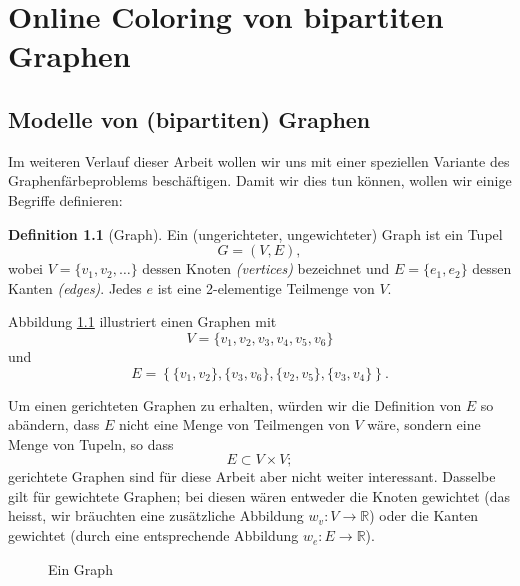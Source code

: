 \documentclass[11pt,abstracton]{scrreprt} %
\theoremstyle{definition}
\newtheorem{definition}{Definition}
\begin{document}
\chapter{Online Coloring von bipartiten Graphen}

\section{Modelle von (bipartiten) Graphen}

Im weiteren Verlauf dieser Arbeit wollen wir uns mit einer speziellen Variante des Graphenfärbeproblems beschäftigen. Damit wir dies tun können, wollen wir einige Begriffe definieren:

\begin{definition}[Graph]

Ein (ungerichteter, ungewichteter) Graph ist ein Tupel
\[
	G = (V, E),
\]
wobei $V = \{v_1, v_2, \dots \}$ dessen Knoten {\sl (vertices)} bezeichnet und $E = \{ e_1, e_2 \}$ dessen Kanten {\sl (edges)}. Jedes $e$ ist eine 2-elementige Teilmenge von $V$. \cite{biggs}

\end{definition}

Abbildung \ref{graph} illustriert einen Graphen mit
\[
	V = \{v_1,v_2,v_3,v_4,v_5,v_6\}
\]
und
\[
	E = \left\{  \{v_1,v_2\}, \{v_3,v_6\}, \{v_2,v_5\}, \{v_3,v_4\}  \right\}.
\]

\bigskip
Um einen gerichteten Graphen zu erhalten, würden wir die Definition von $E$ so abändern, dass $E$ nicht eine Menge von Teilmengen von $V$ wäre, sondern eine Menge von Tupeln, so dass
\[
E \subset V \times V;
\]
gerichtete Graphen sind für diese Arbeit aber nicht weiter interessant. Dasselbe gilt für gewichtete Graphen; bei diesen wären entweder die Knoten gewichtet (das heisst, wir bräuchten eine zusätzliche Abbildung $w_v : V \rightarrow \mathbb{R}$) oder die Kanten gewichtet (durch eine entsprechende Abbildung $w_e : E \rightarrow \mathbb{R}$).

\begin{figure}
\caption{Ein Graph}
\label{graph}
\begin{center}


\end{center}
\end{figure}
\end{document}
